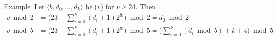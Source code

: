 Example:
Let $\langle b, d_0, \ldots, d_k\rangle$ be \DborIntegerValue($v$) for $v \ge 24$.
Then
\begin{align*}
    v \bmod 2
        & = \big(23 + \sum_{i = 0}^k (d_i + 1) 2^{8 i}\big) \bmod 2
        = d_0 \bmod 2 \\
    v \bmod 5
        & = \big(23 + \sum_{i = 0}^k (d_i + 1) 2^{8 i}\big) \bmod 5
        = \big(\sum_{i = 0}^k (d_i \bmod 5) + k + 4\big) \bmod 5
\end{align*}
